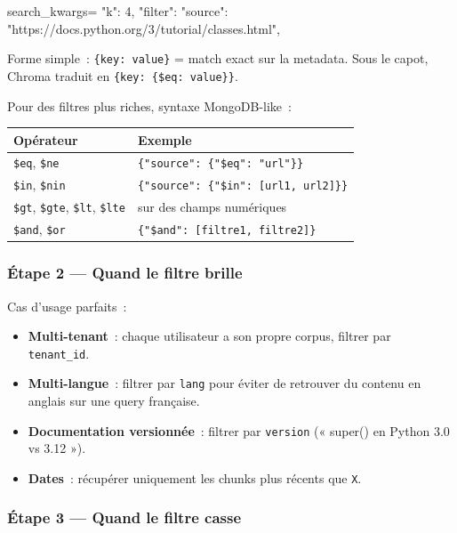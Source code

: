 \documentclass[11pt,a4paper]{article}
\begin{document}
\begin{pythoncode}
search_kwargs={
    "k": 4,
    "filter": {"source": "https://docs.python.org/3/tutorial/classes.html"},
}
\end{pythoncode}

Forme simple~: \texttt{\{key: value\}} = match exact sur la metadata.
Sous le capot, Chroma traduit en \texttt{\{key: \{\$eq: value\}\}}.

Pour des filtres plus riches, syntaxe MongoDB-like~:

\begin{center}
\begin{tabular}{ll}
\toprule
\textbf{Opérateur} & \textbf{Exemple} \\
\midrule
\texttt{\$eq}, \texttt{\$ne}
& \texttt{\{"source": \{"\$eq": "url"\}\}} \\
\texttt{\$in}, \texttt{\$nin}
& \texttt{\{"source": \{"\$in": [url1, url2]\}\}} \\
\texttt{\$gt}, \texttt{\$gte}, \texttt{\$lt}, \texttt{\$lte}
& sur des champs numériques \\
\texttt{\$and}, \texttt{\$or}
& \texttt{\{"\$and": [filtre1, filtre2]\}} \\
\bottomrule
\end{tabular}
\end{center}

\subsubsection*{Étape 2 — Quand le filtre brille}

Cas d'usage parfaits~:
\begin{itemize}[leftmargin=*]
  \item \textbf{Multi-tenant}~: chaque utilisateur a son propre corpus,
        filtrer par \texttt{tenant\_id}.
  \item \textbf{Multi-langue}~: filtrer par \texttt{lang} pour éviter
        de retrouver du contenu en anglais sur une query française.
  \item \textbf{Documentation versionnée}~: filtrer par \texttt{version}
        (« super() en Python 3.0 vs 3.12 »).
  \item \textbf{Dates}~: récupérer uniquement les chunks plus récents
        que \texttt{X}.
\end{itemize}

\subsubsection*{Étape 3 — Quand le filtre casse}
\end{document}
